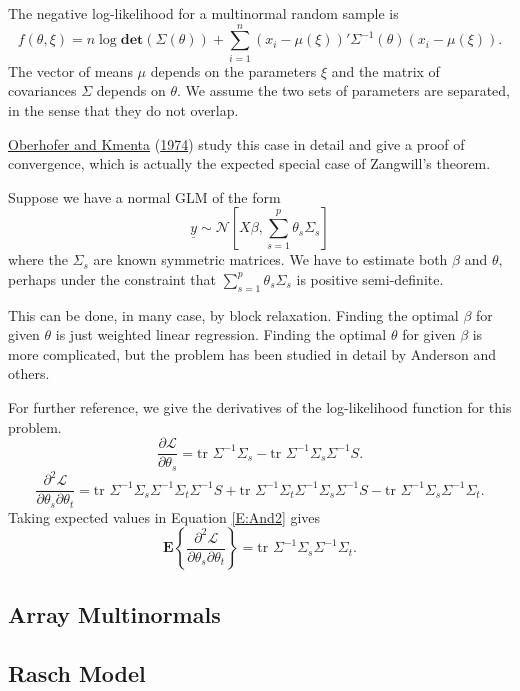 \documentclass[
  12pt,
]{book}
\begin{document}
The negative log-likelihood for a multinormal random sample is
\[
f(\theta,\xi)=n\log\mathbf{det}(\Sigma(\theta))+\sum_{i=1}^n (x_i-\mu(\xi))'\Sigma^{-1}(\theta)(x_i-\mu(\xi)).
\]
The vector of means \(\mu\) depends on the
parameters \(\xi\) and the matrix of covariances \(\Sigma\) depends on \(\theta\). We assume the two sets of parameters are separated, in the sense that they do not overlap.

\protect\hyperlink{ref-oberhofer_kmenta_74}{Oberhofer and Kmenta} (\protect\hyperlink{ref-oberhofer_kmenta_74}{1974}) study this case in detail and give a proof of convergence, which is actually the expected special case of Zangwill's theorem.

Suppose we have a normal GLM of the form
\[
\underline{y}\sim\mathcal{N}[X\beta,\sum_{s=1}^p\theta_s\Sigma_s]
\]
where the \(\Sigma_s\) are known symmetric matrices.
We have to estimate both \(\beta\) and \(\theta,\)
perhaps under the constraint that \(\sum_{s=1}^p\theta_s\Sigma_s\) is positive semi-definite.

This can be done, in many case, by block relaxation.
Finding the optimal \(\beta\) for given \(\theta\) is
just weighted linear regression. Finding the optimal \(\theta\) for given \(\beta\) is more complicated, but
the problem has been studied in detail by Anderson
and others.

For further reference, we give the derivatives of the
log-likelihood function for this problem.
\[
\frac{\partial\mathcal{L}}{\partial\theta_s}=
\text{tr }\Sigma^{-1}\Sigma_s -\text{tr }\Sigma^{-1}\Sigma_s\Sigma^{-1}S.
\]
\[
\frac{\partial^2\mathcal{L}}{\partial\theta_s\partial\theta_t}=
\text{tr }\Sigma^{-1}\Sigma_s\Sigma^{-1}\Sigma_t\Sigma^{-1}S+
\text{tr }\Sigma^{-1}\Sigma_t\Sigma^{-1}\Sigma_s\Sigma^{-1}S-
\text{tr }\Sigma^{-1}\Sigma_s\Sigma^{-1}\Sigma_t.
\]
Taking expected values in Equation \ref{E:And2} gives
\[
\mathbf{E}\left\{\frac{\partial^2\mathcal{L}}{\partial\theta_s\partial\theta_t}\right\}=
\text{tr }\Sigma^{-1}\Sigma_s\Sigma^{-1}\Sigma_t.
\]

\hypertarget{blockrelaxation:additionalexamples:arraymultinormals}{%
\subsection{Array Multinormals}\label{blockrelaxation:additionalexamples:arraymultinormals}}

\hypertarget{blockrelaxation:additionalexamples:raschmodel}{%
\subsection{Rasch Model}\label{blockrelaxation:additionalexamples:raschmodel}}
\end{document}
